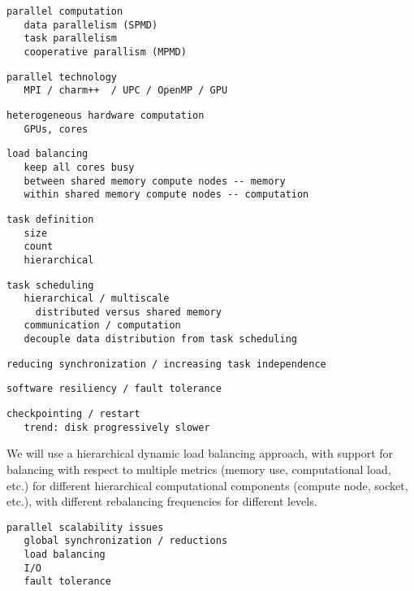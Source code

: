 \documentclass{article}
\begin{document}
\begin{verbatim}
parallel computation
   data parallelism (SPMD)
   task parallelism
   cooperative parallism (MPMD)
\end{verbatim}

\begin{verbatim}
parallel technology
   MPI / charm++  / UPC / OpenMP / GPU
\end{verbatim}

\begin{verbatim}
heterogeneous hardware computation
   GPUs, cores
\end{verbatim}

\begin{verbatim}
load balancing
   keep all cores busy
   between shared memory compute nodes -- memory
   within shared memory compute nodes -- computation
\end{verbatim}

\begin{verbatim}
task definition
   size
   count
   hierarchical
\end{verbatim}

\begin{verbatim}
task scheduling
   hierarchical / multiscale
     distributed versus shared memory
   communication / computation
   decouple data distribution from task scheduling
\end{verbatim}

\begin{verbatim}
reducing synchronization / increasing task independence
\end{verbatim}

\begin{verbatim}
software resiliency / fault tolerance
\end{verbatim}

\begin{verbatim}
checkpointing / restart
   trend: disk progressively slower
\end{verbatim}


We will use a hierarchical dynamic load balancing approach, with
support for balancing with respect to multiple metrics (memory use,
computational load, etc.) for different hierarchical computational
components (compute node, socket, etc.), with different rebalancing
frequencies for different levels.


\begin{verbatim}
parallel scalability issues
   global synchronization / reductions
   load balancing
   I/O
   fault tolerance
\end{verbatim}
\end{document}
